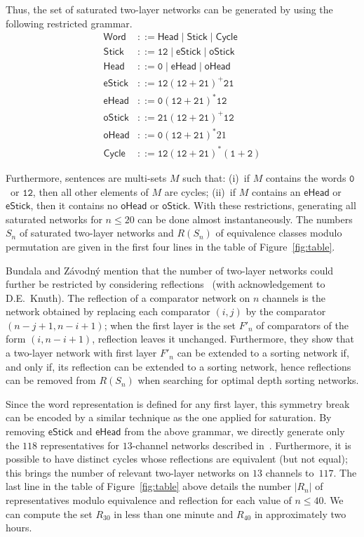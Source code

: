 \documentclass[10pt]{IEEEtran}
\newcommand{\sent}[1]{\ensuremath{\mathtt{#1}}} \newcommand{\GG}{{\cal G}}
\begin{document}
Thus, the set of saturated two-layer networks can be generated by using the
following restricted grammar.
\begin{align*}
  \mathsf{Word} &::= \mathsf{Head} \mid \mathsf{Stick} \mid \mathsf{Cycle}\\
  \mathsf{Stick} &::= \sent{12} \mid \mathsf{eStick} \mid \mathsf{oStick} \\
  \mathsf{Head} &::= \sent0 \mid \mathsf{eHead} \mid \mathsf{oHead}\\
  \mathsf{eStick} &::= \sent{12}(\sent{12}+\sent{21})^+\sent{21} \\
  \mathsf{eHead} &::= \sent0(\sent{12}+\sent{21})^\ast\sent{12}\\
  \mathsf{oStick} &::= \sent{21}(\sent{12}+\sent{21})^+\sent{12} \\
  \mathsf{oHead} &::= \sent0(\sent{12}+\sent{21})^\ast21\\
  \mathsf{Cycle} &::= \sent{12}(\sent{12}+\sent{21})^\ast(\sent{1}+\sent{2})
\end{align*}

Furthermore, sentences are multi-sets $M$ such that:
(i)~if $M$ contains the words \sent0\ or \sent{12}, then all other elements of
$M$ are cycles;
(ii)~if $M$ contains an $\mathsf{eHead}$ or $\mathsf{eStick}$, then it contains
no $\mathsf{oHead}$ or $\mathsf{oStick}$.
With these restrictions, generating all saturated networks for $n\leq 20$
can be done almost instantaneously.  The numbers $S_n$ of
saturated two-layer networks and $R(S_n)$ of equivalence classes
modulo permutation are given in the first four lines in the table of Figure~\ref{fig:table}.

Bundala and Z{\'a}vodn{\'y} mention that the number of two-layer
networks could further be restricted by considering
reflections~\cite{DBLP:conf/lata/BundalaZ14} (with acknowledgement to
D.E.~Knuth).  The reflection of a comparator network on $n$ channels is
the network obtained by replacing each comparator $(i,j)$ by the comparator
$(n-j+1,n-i+1)$; when the first layer is the set $F'_n$ of
comparators of the form $(i,n-i+1)$, reflection leaves it unchanged.
Furthermore, they show that a two-layer network with first layer $F'_n$ can
be extended to a sorting network if, and only if, its reflection can be
extended to a sorting network, hence reflections can be removed from
$R(S_n)$ when searching for optimal depth sorting networks. 

Since the word representation is defined for any first layer, this symmetry
break can be encoded by a similar technique as the one applied for saturation.
By removing $\mathsf{eStick}$ and $\mathsf{eHead}$ from the above grammar,
we directly generate only the $118$ representatives for $13$-channel networks described
in~\cite{DBLP:conf/lata/BundalaZ14}.  Furthermore, it is
possible to have distinct cycles whose reflections are equivalent
(but not equal); this brings the number
of relevant two-layer networks on $13$ channels to~$117$.  The last line in the table of
Figure~\ref{fig:table} above details the number $|R_n|$ of representatives modulo equivalence
and reflection for each value of $n\leq 40$.  We can compute the set
$R_{30}$ in less than one minute and $R_{40}$ in approximately two hours.
\end{document}
